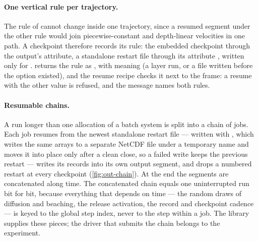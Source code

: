 \paragraph{One vertical rule per trajectory.} The rule of  cannot change inside one
trajectory, since a resumed segment under the other rule would join piecewise-constant and depth-linear
velocities in one path. A checkpoint therefore records its rule: the embedded checkpoint through the output's
 attribute, a standalone restart file through its attribute ,
written only for .  returns the rule as , with 
meaning  (a layer run, or a file written before the option existed), and the resume recipe checks
it next to the frame: a resume with the other value is refused, and the message names both rules.

\paragraph{Resumable chains.} A run longer than one allocation of a batch system is split into a chain of
jobs. Each job resumes from the newest standalone restart file --- written with , which
writes the same arrays to a separate NetCDF file under a temporary name and moves it into place only after a
clean close, so a failed write keeps the previous restart --- writes its records into its own output segment,
and drops a numbered restart at every checkpoint (\cref{fig:out-chain}). At the end the segments are
concatenated along time. The concatenated chain equals one uninterrupted run bit for bit, because everything
that depends on time --- the random draws of diffusion and beaching, the release activation, the record and
checkpoint cadence --- is keyed to the global step index, never to the step within a job. The library supplies
these pieces; the driver that submits the chain belongs to the experiment.

